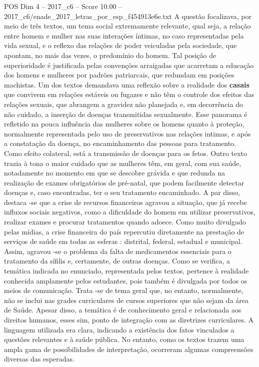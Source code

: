 \begin{textsample}{POS Dim 4 – 2017\_c6 – Score 10.00 – 2017\_c6/enade\_2017\_letras\_por\_esp\_f454913e6e.txt}
A questão focalizava, por meio de três textos, um tema social extremamente relevante, qual seja, a relação entre homem e mulher nas suas interações íntimas, no caso representadas pela vida sexual, e o reflexo das relações de poder veiculadas pela sociedade, que apontam, no mais das vezes, o predomínio do homem.
Tal posição de superioridade é justificada pelas convenções arraigadas que acarretam a educação dos homens e mulheres por padrões patriarcais, que redundam em posições machistas.
Um dos textos demandava uma reflexão sobre a realidade dos \textbf{casais} que convivem em relações estáveis ou fugazes e não têm o controle dos efeitos das relações sexuais, que abrangem a gravidez não planejada e, em decorrência do não cuidado, a inserção de doenças transmitidas sexualmente.
Esse panorama é refletido na pouca influência das mulheres sobre os homens quanto à proteção, normalmente representada pelo uso de preservativos nas relações intimas, e após a constatação da doença, no encaminhamento das pessoas para tratamento.
Como efeito colateral, está a transmissão de doenças para os fetos.
Outro texto trazia à tona o maior cuidado que as mulheres têm, em geral, com sua saúde, notadamente no momento em que se descobre grávida e que redunda na realização de exames obrigatórios de pré-natal, que podem facilmente detectar doenças e, caso encontradas, ter o seu tratamento encaminhado.
A par disso, destaca -se que a crise de recursos financeiros agravou a situação, que já recebe influxos sociais negativos, como a dificuldade do homem em utilizar preservativos, realizar exames e procurar tratamentos quando adoece.
Como muito divulgado pelas mídias, a crise financeira do país repercutiu diretamente na prestação de serviços de saúde em todas as esferas : distrital, federal, estadual e municipal.
Assim, agravou -se o problema da falta de medicamentos essenciais para o tratamento da sífilis e, certamente, de outras doenças.
Como se verifica, a temática indicada no enunciado, representada pelos textos, pertence à realidade conhecida amplamente pelos estudantes, pois também é divulgada por todos os meios de comunicação.
Trata -se de tema geral que, no entanto, normalmente, não se inclui nas grades curriculares de cursos superiores que não sejam da área de Saúde.
Apesar disso, a temática é de conhecimento geral e relacionada aos direitos humanos, esses sim, ponto de integração com as diretrizes curriculares.
A linguagem utilizada era clara, indicando a existência dos fatos vinculados a questões relevantes e à saúde pública.
No entanto, como os textos trazem uma ampla gama de possibilidades de interpretação, ocorreram algumas compreensões diversas das esperadas.

\end{textsample}
